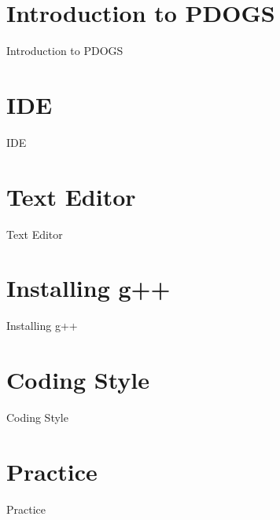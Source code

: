 \documentclass[t]{beamer}
\begin{document}
\section{Introduction to PDOGS}
\begin{frame}{Introduction to PDOGS}
\end{frame}

\section{IDE}
\begin{frame}{IDE}
\end{frame}

\section{Text Editor}
\begin{frame}{Text Editor}
\end{frame}

\section{Installing g++}
\begin{frame}{Installing g++}
\end{frame}

\section{Coding Style}
\begin{frame}{Coding Style}
\end{frame}

\section{Practice}
\begin{frame}{Practice}
\end{frame}
\end{document}
